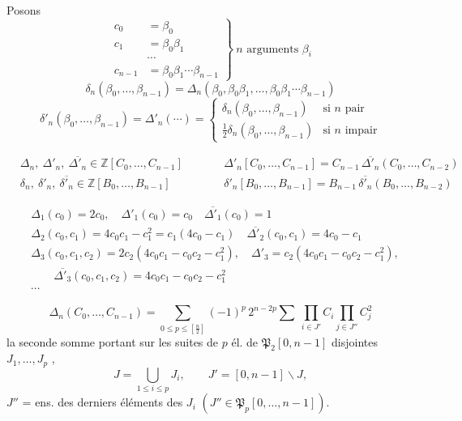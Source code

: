 \documentclass[11pt,a4paper]{article}
\begin{document}
Posons
\[
\left.
\begin{aligned}
c_0 &= \beta_0 \\
c_1 &= \beta_0 \beta_1 \\
&\cdots \\
c_{n-1} &= \beta_0 \beta_1 \cdots \beta_{n-1}
\end{aligned}
\right\rbrace \ n \text{ arguments } \beta_i
\]
\[
\delta_n(\beta_0, \ldots, \beta_{n-1}) = \Delta_n(\beta_0, \beta_0\beta_1, \ldots,
\beta_0\beta_1 \cdots \beta_{n-1})
\]
\[
\delta'_n(\beta_0, \ldots, \beta_{n-1}) = \Delta'_n(\cdots) =
\begin{cases}
\delta_n(\beta_0, \ldots, \beta_{n-1}) & \text{si } n \text{ pair} \\
\frac{1}{2} \delta_n(\beta_0, \ldots, \beta_{n-1}) & \text{si } n \text{ impair}
\end{cases}
\]

\[
\begin{aligned}
&\Delta_n,\ \Delta'_n,\ \overline{\Delta'_n} \in \mathbb{Z}[C_0, \ldots, C_{n-1}]
&\qquad& \Delta'_n[C_0, \ldots, C_{n-1}] = C_{n-1}\, \overline{\Delta'_{n}}(C_0, \ldots, C_{n-2}) \\
&\delta_n,\ \delta'_n,\ \overline{\delta'_n} \in \mathbb{Z}[B_0, \ldots, B_{n-1}]
&& \delta'_n[B_0, \ldots, B_{n-1}] = B_{n-1}\, \overline{\delta'_n}(B_0, \ldots, B_{n-2})
\end{aligned}
\]

\[
\begin{aligned}
&\Delta_1(c_0) = 2c_0, \quad \Delta'_1(c_0) = c_0 \quad \overline{\Delta'_1}(c_0) = 1 \\
&\Delta_2(c_0, c_1) = 4c_0c_1 - c_1^2 = c_1(4c_0 - c_1) \quad
\overline{\Delta'_2}(c_0, c_1) = 4c_0 - c_1 \\
&\Delta_3(c_0, c_1, c_2) = 2c_2(4c_0c_1 - c_0c_2 - c_1^2), \quad
\Delta'_3 = c_2(4c_0c_1 - c_0c_2 - c_1^2), \\
&\qquad \overline{\Delta'_3}(c_0, c_1, c_2) = 4c_0c_1 - c_0c_2 - c_1^2 \\
&\cdots
\end{aligned}
\]

\[
\Delta_n(C_0, \ldots, C_{n-1}) = \sum_{0 \leqslant p \leqslant [\frac{n}{2}]}
(-1)^p\, 2^{n-2p} \sum \ \prod_{i \in J'} C_i \prod_{j \in J''} C_j^2
\]
la seconde somme portant sur les suites de $p$ \struck{\ill{}} él. de
$\mathfrak{P}_2[0, n-1]$ disjointes $J_1, \ldots, J_p$ \struck{\ill{}},
\[
J = \bigcup_{1 \leqslant i \leqslant p} J_i, \qquad
J' = [0, n-1] \smallsetminus J,
\]
$J''$ = ens. des derniers éléments des $J_i$
$(J'' \in \mathfrak{P}_p[0, \ldots, n-1])$.
\end{document}
